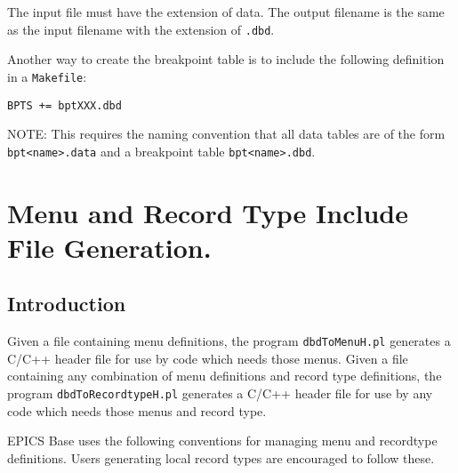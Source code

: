 The input file must have the extension of data.
The output filename is the same as the input filename with the extension of \verb|.dbd|.

Another way to create the breakpoint table is to include the following definition in a \verb|Makefile|:

\begin{verbatim}
BPTS += bptXXX.dbd
\end{verbatim}

NOTE: This requires the naming convention that all data tables are of the form \verb|bpt<name>.data| and a breakpoint table \verb|bpt<name>.dbd|.

\section{Menu and Record Type Include File Generation.}

\subsection{Introduction}

Given a file containing menu definitions, the program \verb|dbdToMenuH.pl| generates a C/C++ header file for use by code which needs those menus.
Given a file containing any combination of menu definitions and record type definitions, the program \verb|dbdToRecordtypeH.pl| generates a C/C++ header file for use by any code which needs those menus and record type.

EPICS Base uses the following conventions for managing menu and recordtype definitions.
Users generating local record types are encouraged to follow these.

